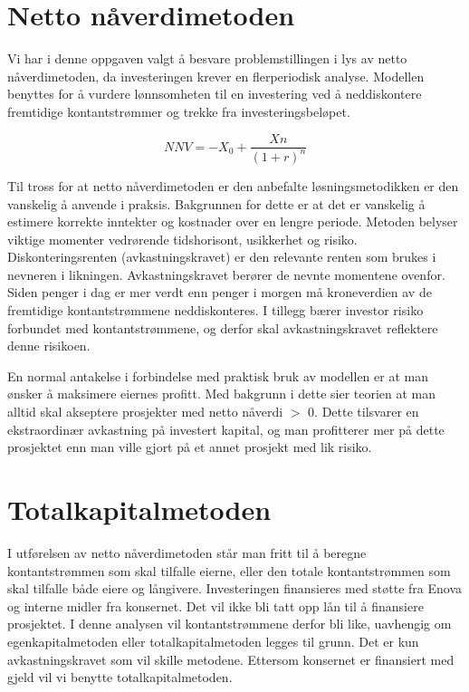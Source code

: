 \section{Netto nåverdimetoden}
Vi har i denne oppgaven valgt å besvare problemstillingen i lys av netto nåverdimetoden, da investeringen krever en flerperiodisk analyse. Modellen benyttes for å vurdere lønnsomheten til en investering ved å neddiskontere fremtidige kontantstrømmer og trekke fra investeringsbeløpet. 

\[NNV={-X_0} + \frac {Xn}{(1+r)^n}\]

Til tross for at netto nåverdimetoden er den anbefalte løsningsmetodikken er den vanskelig å anvende i praksis. Bakgrunnen for dette er at det er vanskelig å estimere korrekte inntekter og kostnader over en lengre periode. Metoden belyser viktige momenter vedrørende tidshorisont, usikkerhet og risiko. Diskonteringsrenten (avkastningskravet) er den relevante renten som brukes i nevneren i likningen. Avkastningskravet berører de nevnte momentene ovenfor. Siden penger i dag er mer verdt enn penger i morgen må kroneverdien av de fremtidige kontantstrømmene neddiskonteres. I tillegg bærer investor risiko forbundet med kontantstrømmene, og derfor skal avkastningskravet reflektere denne risikoen.

\indent \newline
En normal antakelse i forbindelse med praktisk bruk av modellen er at man ønsker å maksimere eiernes profitt. Med bakgrunn i dette sier teorien at man alltid skal akseptere prosjekter med netto nåverdi $>$ 0. Dette tilsvarer en ekstraordinær avkastning på investert kapital, og man profitterer mer på dette prosjektet enn man ville gjort på et annet prosjekt med lik risiko.

\section{Totalkapitalmetoden}
I utførelsen av netto nåverdimetoden står man fritt til å beregne kontantstrømmen som skal tilfalle eierne, eller den totale kontantstrømmen som skal tilfalle både eiere og långivere. Investeringen finansieres med støtte fra Enova og interne midler fra konsernet. Det vil ikke bli tatt opp lån til å finansiere prosjektet. I denne analysen vil kontantstrømmene derfor bli like, uavhengig om egenkapitalmetoden eller totalkapitalmetoden legges til grunn. Det er kun avkastningskravet som vil skille metodene. Ettersom konsernet er finansiert med gjeld vil vi benytte totalkapitalmetoden. 

